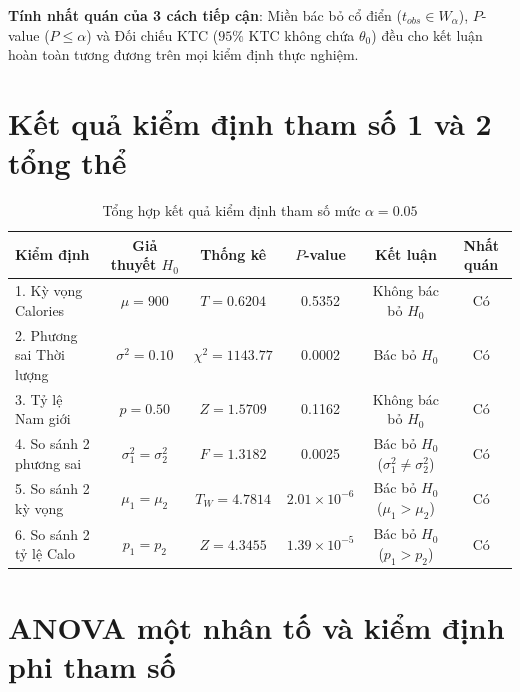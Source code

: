 \documentclass[12pt,a4paper]{report}
\begin{document}
\textbf{Tính nhất quán của 3 cách tiếp cận}: Miền bác bỏ cổ điển ($t_{obs} \in W_\alpha$), $P$-value ($P \le \alpha$) và Đối chiếu KTC ($95\%$ KTC không chứa $\theta_0$) đều cho kết luận hoàn toàn tương đương trên mọi kiểm định thực nghiệm.

\section{Kết quả kiểm định tham số 1 và 2 tổng thể}
\begin{table}[htbp]
\centering\footnotesize
\caption{Tổng hợp kết quả kiểm định tham số mức $\alpha = 0.05$}
\begin{tabularx}{\textwidth}{lccccc}
\toprule
\textbf{Kiểm định} & \textbf{Giả thuyết $H_0$} & \textbf{Thống kê} & \textbf{$P$-value} & \textbf{Kết luận} & \textbf{Nhất quán} \\
\midrule
1. Kỳ vọng Calories & $\mu = 900$ & $T = 0.6204$ & 0.5352 & Không bác bỏ $H_0$ & Có \\
2. Phương sai Thời lượng & $\sigma^2 = 0.10$ & $\chi^2 = 1143.77$ & 0.0002 & Bác bỏ $H_0$ & Có \\
3. Tỷ lệ Nam giới & $p = 0.50$ & $Z = 1.5709$ & 0.1162 & Không bác bỏ $H_0$ & Có \\
4. So sánh 2 phương sai & $\sigma_1^2 = \sigma_2^2$ & $F = 1.3182$ & 0.0025 & Bác bỏ $H_0$ ($\sigma_1^2 \ne \sigma_2^2$) & Có \\
5. So sánh 2 kỳ vọng & $\mu_1 = \mu_2$ & $T_W = 4.7814$ & $2.01 \times 10^{-6}$ & Bác bỏ $H_0$ ($\mu_1 > \mu_2$) & Có \\
6. So sánh 2 tỷ lệ Calo & $p_1 = p_2$ & $Z = 4.3455$ & $1.39 \times 10^{-5}$ & Bác bỏ $H_0$ ($p_1 > p_2$) & Có \\
\bottomrule
\end{tabularx}
\end{table}

\section{ANOVA một nhân tố và kiểm định phi tham số}
\end{document}
